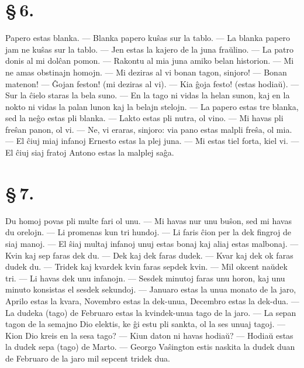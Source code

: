 \enlargethispage{-\baselineskip}
\section*{\S\,6.}
Papero estas blanka. --- Blanka papero ku\^sas sur la tablo. --- La
blanka papero jam ne ku\^sas sur la tablo. --- Jen estas la kajero
de la juna fra\u ulino. --- La patro donis al mi dol\^can pomon. ---
Rakontu al mia juna amiko belan historion. --- Mi ne amas obstinajn
homojn. --- Mi deziras al vi bonan tagon, sinjoro! --- Bonan
matenon! --- \^Gojan feston! (mi deziras al vi). --- Kia \^goja
festo! (estas hodia\u u). --- Sur la \^cielo staras la bela suno.
--- En la tago ni vidas la helan sunon, kaj en la nokto ni vidas la
palan lunon kaj la belajn stelojn. --- La papero estas tre blanka,
sed la ne\^go estas pli blanka. --- Lakto estas pli nutra, ol vino.
--- Mi havas pli fre\^san panon, ol vi. --- Ne, vi eraras, sinjoro:
via pano estas malpli fre\^sa, ol mia. --- El \^ciuj miaj infanoj
Ernesto estas la plej juna. --- Mi estas tiel forta, kiel vi. --- El
\^ciuj siaj fratoj Antono estas la malplej sa\^ga.

\section*{\S\,7.}
Du homoj povas pli multe fari ol unu. --- Mi havas nur unu bu\^son,
sed mi havas du orelojn. --- Li promenas kun tri hundoj. --- Li
faris \^cion per la dek fingroj de siaj manoj. --- El \^siaj multaj
infanoj unuj estas bonaj kaj aliaj estas malbonaj. --- Kvin kaj sep
faras dek du. --- Dek kaj dek faras dudek. --- Kvar kaj dek ok faras
dudek du. --- Tridek kaj kvardek kvin faras sepdek kvin. --- Mil
okcent na\u udek tri. --- Li havas dek unu infanojn. --- Sesdek
minutoj faras unu horon, kaj unu minuto konsistas el sesdek
sekundoj. --- Januaro estas la unua monato de la jaro, Aprilo estas
la kvara, Novembro estas la dek-unua, Decembro estas la dek-dua.
--- La dudeka (tago) de Februaro estas la kvindek-unua tago de la
jaro. --- La sepan tagon de la semajno Dio elektis, ke \^gi estu pli
sankta, ol la ses unuaj tagoj. --- Kion Dio kreis en la sesa tago?
--- Kiun daton ni havas hodia\u u? --- Hodia\u u estas la dudek sepa
(tago) de Marto. --- Georgo Va\^sington estis naskita la dudek duan
de Februaro de la jaro mil sepcent tridek dua.


